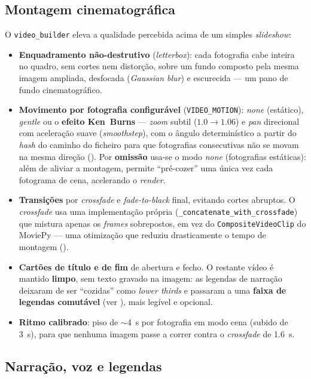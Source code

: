 \subsection{Montagem cinematográfica}

O \texttt{video\_builder} eleva a qualidade percebida acima de um simples
\emph{slideshow}:

\begin{itemize}[leftmargin=*]
  \item \textbf{Enquadramento não-destrutivo} (\emph{letterbox}): cada
  fotografia cabe inteira no quadro, sem cortes nem distorção, sobre um
  fundo composto pela mesma imagem ampliada, desfocada (\emph{Gaussian
  blur}) e escurecida — um pano de fundo cinematográfico.
  \item \textbf{Movimento por fotografia configurável}
  (\texttt{VIDEO\_MOTION}): \emph{none} (estático), \emph{gentle} ou o
  \textbf{efeito Ken~Burns} --- \emph{zoom} subtil ($1.0\!\rightarrow\!1.06$)
  e \emph{pan} direcional com aceleração suave (\emph{smoothstep}), com o
  ângulo determinístico a partir do \emph{hash} do caminho do ficheiro para
  que fotografias consecutivas não se movam na mesma direção
  (). Por \textbf{omissão} usa-se o modo \emph{none}
  (fotografias estáticas): além de aliviar a montagem, permite ``pré-cozer''
  uma única vez cada fotograma de cena, acelerando o \emph{render}.
  \item \textbf{Transições} por \emph{crossfade} e \emph{fade-to-black}
  final, evitando cortes abruptos. O \emph{crossfade} usa uma implementação
  própria (\texttt{\_concatenate\_with\_crossfade}) que mistura apenas os
  \emph{frames} sobrepostos, em vez do \texttt{CompositeVideoClip} do
  MoviePy --- uma otimização que reduziu drasticamente o tempo de montagem
  ().
  \item \textbf{Cartões de título e de fim} de abertura e fecho. O restante
  vídeo é mantido \textbf{limpo}, sem texto gravado na imagem: as legendas
  de narração deixaram de ser ``cozidas'' como \emph{lower thirds} e passaram
  a uma \textbf{faixa de legendas comutável} (ver
  ), mais legível e opcional.
  \item \textbf{Ritmo calibrado}: piso de $\sim$4~s por fotografia em modo
  cena (subido de 3~s), para que nenhuma imagem passe a correr contra o
  \emph{crossfade} de 1.6~s.
\end{itemize}

\subsection{Narração, voz e legendas}
\label{sub:narracao_legendas}

